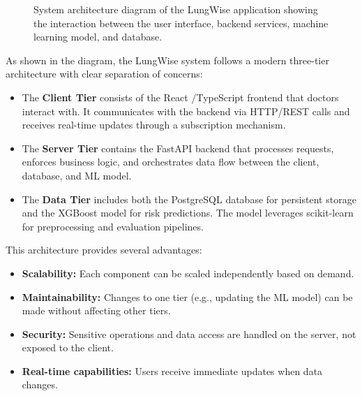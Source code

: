 \begin{figure}[h]
    \caption{System architecture diagram of the LungWise application showing the interaction between the user interface, backend services, machine learning model, and database.}
    \label{fig:system_architecture}
\end{figure}

As shown in the diagram, the LungWise system follows a modern three-tier architecture with clear separation of concerns:

\begin{itemize}
    \item The \textbf{Client Tier} consists of the React \cite{react}/TypeScript \cite{typescript} frontend that doctors interact with. It communicates with the backend via HTTP/REST calls and receives real-time updates through a subscription mechanism.
    
    \item The \textbf{Server Tier} contains the FastAPI \cite{fastapi} backend that processes requests, enforces business logic, and orchestrates data flow between the client, database, and ML model.
    
    \item The \textbf{Data Tier} includes both the PostgreSQL \cite{postgresql} database for persistent storage and the XGBoost \cite{chen2016xgboost} model for risk predictions. The model leverages scikit-learn \cite{pedregosa2011scikit} for preprocessing and evaluation pipelines.
\end{itemize}

This architecture provides several advantages:
\begin{itemize}
    \item \textbf{Scalability:} Each component can be scaled independently based on demand.
    \item \textbf{Maintainability:} Changes to one tier (e.g., updating the ML model) can be made without affecting other tiers.
    \item \textbf{Security:} Sensitive operations and data access are handled on the server, not exposed to the client.
    \item \textbf{Real-time capabilities:} Users receive immediate updates when data changes.
\end{itemize}
